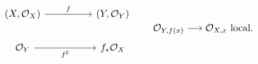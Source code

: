 \[
\begin{tikzcd}[column sep=huge]
(X,\OO_X) \arrow[r,"f"] & (Y,\OO_Y)\\
\OO_Y \arrow[r,"f^\sharp"'] & f_*\OO_X
\end{tikzcd}
\qquad
\OO_{Y,f(x)}\longrightarrow\OO_{X,x}\ \text{local}.
\]
